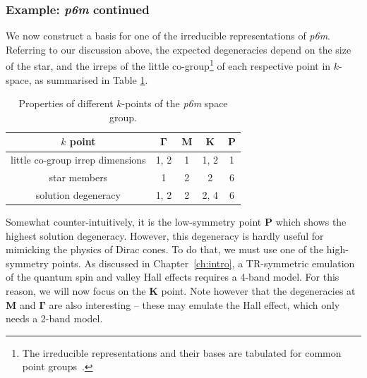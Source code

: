 \subsubsection{Example: \textit{p6m} continued}

We now construct a basis for one of the irreducible representations of \textit{p6m}. Referring to our discussion above, the expected degeneracies depend on the size of the star, and the irreps of the little co-group\footnote{The irreducible representations and their bases are tabulated for common point groups~\cite{Bradley_2009}.} of each respective point in $k$-space, as summarised in Table \ref{table:symm_p6m_degs}.
\begin{table} [h!]
 		\centering
 		\caption{Properties of different $k$-points of the \textit{p6m} space group. }
		\label{table:symm_p6m_degs}
 	\begin{tabular}{ c c c c c }
 		$k$ point & $\boldsymbol{\Gamma}$ & $\boldsymbol{M}$ & $\boldsymbol{K}$ & $\boldsymbol{P}$  \\ \hline
 		little co-group irrep dimensions & 1, 2 & 1 & 1, 2 & 1 \\
 		star members & 1 & 2 & 2 & 6 \\
 		solution degeneracy & 1, 2 & 2 & 2, 4 & 6 \\
 	\end{tabular}
\end{table}

Somewhat counter-intuitively, it is the low-symmetry point $\boldsymbol{P}$ which shows the highest solution degeneracy. However, this degeneracy is hardly useful for mimicking the physics of Dirac cones. To do that, we must use one of the high-symmetry points. As discussed in Chapter~\ref{ch:intro}, a TR-symmetric emulation of the quantum spin and valley Hall effects requires a 4-band model. For this reason, we will now focus on the $\boldsymbol{K}$ point. Note however that the degeneracies at $\boldsymbol{M}$ and $\boldsymbol{\Gamma}$ are also interesting -- these may emulate the Hall effect, which only needs a 2-band model. 

